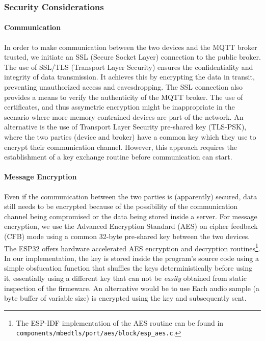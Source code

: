 \documentclass[conference]{IEEEtran}
\begin{document}
\subsubsection{Security Considerations}

\paragraph{Communication}

In order to make communication between the two devices and the MQTT broker
trusted, we initiate an SSL (Secure Socket Layer) connection to the public broker. 
The use of SSL/TLS (Transport Layer Security)
ensures the confidentiality and integrity of data transmission. 
It achieves this by encrypting the data in transit, preventing
unauthorized access and eavesdropping. The SSL connection also provides a means
to verify the authenticity of the MQTT broker.
The use of certificates, and thus assymetric encryption might be inappropriate in the scenario where more 
memory contrained devices are part of the network. 
An alternative is the use of Transport Layer Security pre-shared key (TLS-PSK), where the two parties 
(device and broker) have a common key which they use to encrypt their communication channel.
However, this approach requires the establishment of a key exchange routine before communication can start.

\paragraph{Message Encryption}

Even if the communication between the two parties is (apparently) secured, data still needs to be encrypted because of the possibility 
of the communication channel being compromised or the data being stored inside a server.
For message encryption, we use the Advanced Encryption Standard (AES) on cipher feedback (CFB) mode using 
a common 32-byte pre-shared key between the two devices.
The ESP32 offers hardware accelerated AES encryption and decryption routines\footnote{The ESP-IDF implementation of the AES routine can be found in \texttt{components/mbedtls/port/aes/block/esp\_aes.c}.}.
In our implementation, the key is stored inside the program's source code using 
a simple obsfucation function that shuffles the keys deterministically before using it, essentially
using a different key that can not be \textit{easily} obtained from static inspection of the firmeware.
An alternative would be to use 
Each audio sample (a byte buffer of variable size) is encrypted using the key 
and subsequently sent.
\end{document}

